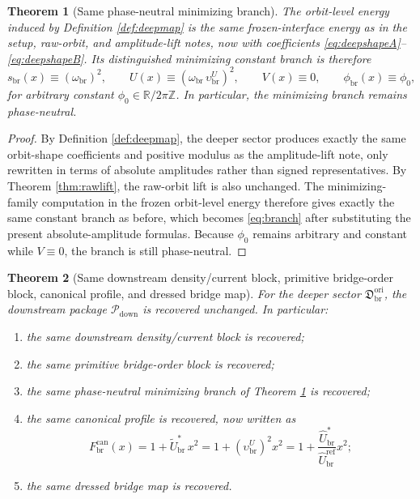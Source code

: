\documentclass[11pt]{article}
\newcommand{\RespShapeEq}{\widetilde U_{\mathrm{br}}^{\ast}}
\newcommand{\RespRawRef}{\widehat U_{\mathrm{br}}^{\mathrm{ref}}}
\newcommand{\RespRawEq}{\widehat U_{\mathrm{br}}^{\ast}}
\newcommand{\RespVacPhase}{\phi_{\mathrm{br}}}
\newcommand{\CurvProfileCan}{F_{\mathrm{br}}^{\mathrm{can}}}
\newcommand{\DownPkg}{\mathscr P_{\mathrm{down}}}
\newcommand{\ScaleMod}{s_{\mathrm{br}}}
\newcommand{\OriginSector}{\mathfrak D_{\mathrm{br}}^{\mathrm{ori}}}
\newcommand{\AbsEqAmp}{\upsilon_{\mathrm{br}}^{U}}
\newcommand{\AbsScaleAmp}{\omega_{\mathrm{br}}}
\newtheorem{theorem}{Theorem}
\begin{document}
\begin{theorem}[Same phase-neutral minimizing branch]
\label{thm:branch}
The orbit-level energy induced by Definition \ref{def:deepmap} is the same frozen-interface energy as in the setup, raw-orbit, and amplitude-lift notes, now with coefficients \eqref{eq:deepshapeA}--\eqref{eq:deepshapeB}. Its distinguished minimizing constant branch is therefore
\begin{equation}
\ScaleMod(x)\equiv (\AbsScaleAmp)^2,
\qquad
U(x)\equiv (\AbsScaleAmp\,\AbsEqAmp)^2,
\qquad
V(x)\equiv 0,
\qquad
\RespVacPhase(x)\equiv\phi_0,
\label{eq:branch}
\end{equation}
for arbitrary constant \(\phi_0\in\mathbb R/2\pi\mathbb Z\). In particular, the minimizing branch remains phase-neutral.
\end{theorem}

\begin{proof}
By Definition \ref{def:deepmap}, the deeper sector produces exactly the same orbit-shape coefficients and positive modulus as the amplitude-lift note, only rewritten in terms of absolute amplitudes rather than signed representatives. By Theorem \ref{thm:rawlift}, the raw-orbit lift is also unchanged. The minimizing-family computation in the frozen orbit-level energy therefore gives exactly the same constant branch as before, which becomes \eqref{eq:branch} after substituting the present absolute-amplitude formulas. Because \(\phi_0\) remains arbitrary and constant while \(V\equiv0\), the branch is still phase-neutral.
\end{proof}

\begin{theorem}[Same downstream density/current block, primitive bridge-order block, canonical profile, and dressed bridge map]
\label{thm:downstream}
For the deeper sector \(\OriginSector\), the downstream package \(\DownPkg\) is recovered unchanged. In particular:
\begin{enumerate}
    \item the same downstream density/current block is recovered;
    \item the same primitive bridge-order block is recovered;
    \item the same phase-neutral minimizing branch of Theorem \ref{thm:branch} is recovered;
    \item the same canonical profile is recovered, now written as
    \begin{equation}
    \CurvProfileCan(x)
    =
    1+\RespShapeEq\,x^2
    =
    1+(\AbsEqAmp)^2x^2
    =
    1+\frac{\RespRawEq}{\RespRawRef}x^2;
    \label{eq:profileabs}
    \end{equation}
    \item the same dressed bridge map is recovered.
\end{enumerate}
\end{theorem}
\end{document}
